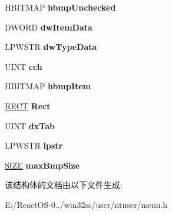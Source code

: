\begin{DoxyCompactItemize}
H\+B\+I\+T\+M\+AP {\bfseries hbmp\+Unchecked}
\item 
\mbox{\label{structtag_r_o_s_m_e_n_u_i_t_e_m_i_n_f_o_af4f8496073ebe93803580dd67cccbb28}} 
D\+W\+O\+RD {\bfseries dw\+Item\+Data}
\item 
\mbox{\label{structtag_r_o_s_m_e_n_u_i_t_e_m_i_n_f_o_adbf5606dedd3ffdde0a0aef6b8612e49}} 
L\+P\+W\+S\+TR {\bfseries dw\+Type\+Data}
\item 
\mbox{\label{structtag_r_o_s_m_e_n_u_i_t_e_m_i_n_f_o_aedb639c13b1f3139ba68c5eee062e651}} 
U\+I\+NT {\bfseries cch}
\item 
\mbox{\label{structtag_r_o_s_m_e_n_u_i_t_e_m_i_n_f_o_a22b4528a0111bf9f269fc669d27e800c}} 
H\+B\+I\+T\+M\+AP {\bfseries hbmp\+Item}
\item 
\mbox{\label{structtag_r_o_s_m_e_n_u_i_t_e_m_i_n_f_o_a8c81408ba0f6f55867207e75ef01500c}} 
\hyperlink{structtag_r_e_c_t}{R\+E\+CT} {\bfseries Rect}
\item 
\mbox{\label{structtag_r_o_s_m_e_n_u_i_t_e_m_i_n_f_o_a2f3191e13cb8645e70eac34c1f4c80d6}} 
U\+I\+NT {\bfseries dx\+Tab}
\item 
\mbox{\label{structtag_r_o_s_m_e_n_u_i_t_e_m_i_n_f_o_ae5e251a9a3c8a505b10dd40cd428ccd8}} 
L\+P\+W\+S\+TR {\bfseries lpstr}
\item 
\mbox{\label{structtag_r_o_s_m_e_n_u_i_t_e_m_i_n_f_o_a34b55058465bbb364f8ad54d9a0d5be2}} 
\hyperlink{structtag_s_i_z_e}{S\+I\+ZE} {\bfseries max\+Bmp\+Size}
\end{DoxyCompactItemize}


该结构体的文档由以下文件生成\+:\begin{DoxyCompactItemize}
\item 
E\+:/\+React\+O\+S-\/0../win32ss/user/ntuser/menu.\+h\end{DoxyCompactItemize}
